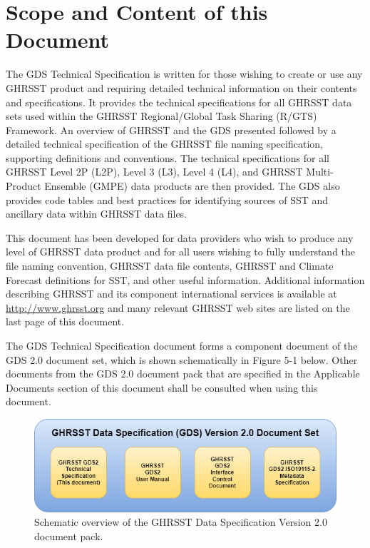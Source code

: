 \pagebreak
\section{Scope and Content of this Document}
The GDS Technical Specification is written for those wishing to create or use any GHRSST product
and requiring detailed technical information on their contents and specifications. It provides the
technical specifications for all GHRSST data sets used within the GHRSST Regional/Global Task
Sharing (R/GTS) Framework. An overview of GHRSST and the GDS presented followed by a detailed
technical specification of the GHRSST file naming specification, supporting definitions and
conventions. The technical specifications for all GHRSST Level 2P (L2P), Level 3 (L3), Level 4 (L4),
and GHRSST Multi-Product Ensemble (GMPE) data products are then provided. The GDS also
provides code tables and best practices for identifying sources of SST and ancillary data within
GHRSST data files.\par\vspace{0.25cm}
\noindent This document has been developed for data providers who wish to produce any level of GHRSST
data product and for all users wishing to fully understand the file naming convention, GHRSST data
file contents, GHRSST and Climate Forecast definitions for SST, and other useful information.
Additional information describing GHRSST and its component international services is available at
\url{http://www.ghrsst.org} and many relevant GHRSST web sites are listed on the last page of this
document.\par\vspace{0.25cm}
\noindent The GDS Technical Specification document forms a component document of the GDS 2.0 document
set, which is shown schematically in Figure 5-1 below. Other documents from the GDS 2.0 document
pack that are specified in the Applicable Documents section of this document shall be consulted when
using this document. \par\vspace{0.25cm}
\begin{figure}[h]
    \centering
    \includegraphics[width=1 \textwidth]{../images/schematicOverview.drawio.png}
    \caption{Schematic overview of the GHRSST Data Specification Version 2.0 document pack.}
    \label{fig:schematic_overview}
\end{figure}